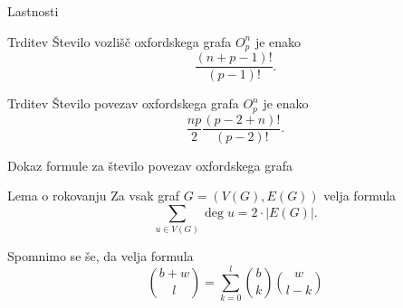 \documentclass[dvipsnames]{beamer}
\newcommand{\graf}[1][G]{\ensuremath{#1 = (V(#1), E(#1))}}
\DeclareMathOperator {\stopnja} {deg}
\begin{document}
\begin{frame}{Lastnosti}
    \begin{block}{Trditev}
           Število vozlišč oxfordskega grafa $O^n_p$ je enako \[\frac{(n+p-1)!}{(p-1)!}.\]
    \end{block}    
    \begin{block}{Trditev}
        Število povezav oxfordskega grafa $O^n_p$ je enako
        \[ \frac{np}{2} \frac{(p-2+n)!}{(p-2)!} .\]
    \end{block}
    

\end{frame}

\begin{frame}{Dokaz formule za število povezav oxfordskega grafa}
    \begin{block}{Lema o rokovanju}
        Za vsak graf $\graf$ velja formula
        \begin{equation*}
        \sum_{u \in V(G)}\!\! \stopnja u = 2 \cdot |E(G)|.
        \end{equation*}
    \end{block}
    
    Spomnimo se še, da velja formula 
    \[ {b+w \choose l} = \sum_{k=0}^{l}{b \choose k}{w \choose l-k} \]
\end{frame}

\end{document}
